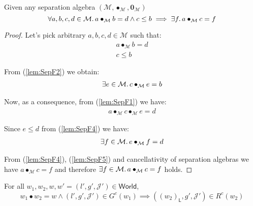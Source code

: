 \lem \label{lem:SepF} Given any separation algebra $(\mathcal{M}, \bullet_\mathcal{M}, \mathbf{0}_\mathcal{M})$
\[
	\forall a, b, c, d \in \mathcal{M} \ldotp a \bullet_\mathcal{M} b = d \land c \leq b \implies \exists f \ldotp a \bullet_\mathcal{M} c = f
\]

{\parindent0pt
\begin{proof}
Let's pick arbitrary $a, b, c, d \in \mathcal{M}$ such that:
\begin{gather}
	\label{lem:SepF1} a \bullet_\mathcal{M} b = d
	\\
	\label{lem:SepF2} c \leq b
\end{gather}

From (\ref{lem:SepF2}) we obtain:
\begin{gather}
	\label{lem:SepF3} \exists e \in \mathcal{M} \ldotp c \bullet_\mathcal{M} e = b
\end{gather}

Now, as a consequence, from (\ref{lem:SepF1}) we have:
\begin{gather}
	\label{lem:SepF4} a \bullet_\mathcal{M} c \bullet_\mathcal{M} e = d
\end{gather}

Since $e \leq d$ from (\ref{lem:SepF4}) we have:
\begin{gather}
	\label{lem:SepF5} \exists f \in \mathcal{M} \ldotp e \bullet_\mathcal{M} f = d
\end{gather}

From (\ref{lem:SepF4}), (\ref{lem:SepF5}) and cancellativity of separation algebras we have $a \bullet_\mathcal{M} c = f$ and therefore $\exists f \in \mathcal{M} \ldotp a \bullet_\mathcal{M} c = f$ holds.
\end{proof}
}

\lem \label{lem:Rc}  For all $w_1, w_2, w, w' = (l', g', \mathcal{J}') \in \mathsf{World}$,
\[
	w_1 \bullet w_2 = w \land (l', g', \mathcal{J}') \in G^c(w_1) \implies ((w_2)_\mathsf{L}, g', \mathcal{J}') \in R^c(w_2)
\]

